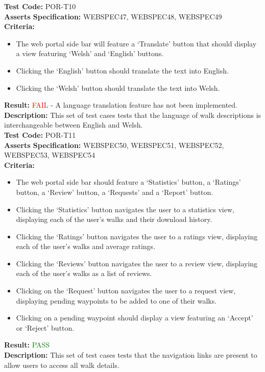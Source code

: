 \documentclass[11pt,a4paper]{report}
\begin{document}
\label{test:POR-T10}
\noindent\textbf{Test Code:} POR-T10\\
\textbf{Asserts Specification:} WEBSPEC47, WEBSPEC48, WEBSPEC49\\ 
\textbf{Criteria:} \begin{itemize}
                     \item The web portal side bar will feature a `Translate' button that should display a view featuring `Welsh' and `English' buttons.
                     \item Clicking the `English' button should translate the text into English.
                     \item Clicking the `Welsh' button should translate the text into Welsh.
                   \end{itemize}  
\textbf{Result:} \textcolor{red}{FAIL} - A language translation feature has not been implemented.\\
\textbf{Description:} This set of test cases tests that the language of walk descriptions is interchangeable between English and Welsh. \\

\label{test:POR-T11}
\noindent\textbf{Test Code:} POR-T11\\
\textbf{Asserts Specification:} WEBSPEC50, WEBSPEC51, WEBSPEC52, WEBSPEC53, WEBSPEC54\\ 
\textbf{Criteria:} \begin{itemize}
                     \item The web portal side bar should feature a `Statistics' button, a `Ratings' button, a `Review' button, a `Requests' and a `Report' button.
                     \item Clicking the `Statistics' button navigates the user to a statistics view, displaying each of the user's walks and their download history.
                     \item Clicking the `Ratings' button navigates the user to a ratings view, displaying each of the user's walks and average ratings.
                     \item Clicking the `Reviews' button navigates the user to a review view, displaying each of the user's walks as a list of reviews.
                     \item Clicking on the `Request' button navigates the user to a request view, displaying pending waypoints to be added to one of their walks.
                     \item Clicking on a pending waypoint should display a view featuring an `Accept' or `Reject' button.
                   \end{itemize}  
\textbf{Result:} \textcolor{green}{PASS}\\
\textbf{Description:} This set of test cases tests that the navigation links are present to allow users to access all walk details. \\
\end{document}
